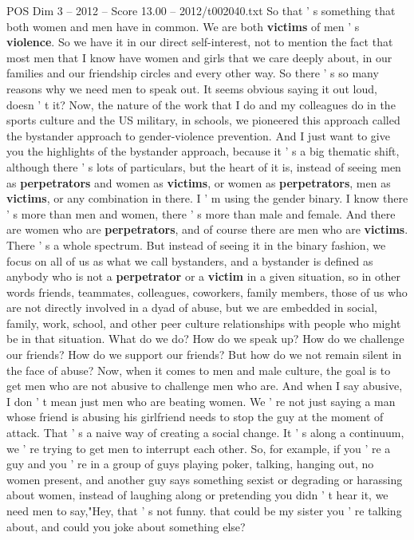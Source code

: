 \begin{textsample}{POS Dim 3 – 2012 – Score 13.00 – 2012/t002040.txt}
So that ' s something that both women and men have in common.
We are both \textbf{victims} of men ' s \textbf{violence}.
So we have it in our direct self-interest, not to mention the fact that most men that I know have women and girls that we care deeply about, in our families and our friendship circles and every other way.
So there ' s so many reasons why we need men to speak out.
It seems obvious saying it out loud, doesn ' t it?
Now, the nature of the work that I do and my colleagues do in the sports culture and the US military, in schools, we pioneered this approach called the bystander approach to gender-violence prevention.
And I just want to give you the highlights of the bystander approach, because it ' s a big thematic shift, although there ' s lots of particulars, but the heart of it is, instead of seeing men as \textbf{perpetrators} and women as \textbf{victims}, or women as \textbf{perpetrators}, men as \textbf{victims}, or any combination in there.
I ' m using the gender binary.
I know there ' s more than men and women, there ' s more than male and female.
And there are women who are \textbf{perpetrators}, and of course there are men who are \textbf{victims}.
There ' s a whole spectrum.
But instead of seeing it in the binary fashion, we focus on all of us as what we call bystanders, and a bystander is defined as anybody who is not a \textbf{perpetrator} or a \textbf{victim} in a given situation, so in other words friends, teammates, colleagues, coworkers, family members, those of us who are not directly involved in a dyad of abuse, but we are embedded in social, family, work, school, and other peer culture relationships with people who might be in that situation.
What do we do?
How do we speak up?
How do we challenge our friends?
How do we support our friends?
But how do we not remain silent in the face of abuse?
Now, when it comes to men and male culture, the goal is to get men who are not abusive to challenge men who are.
And when I say abusive, I don ' t mean just men who are beating women.
We ' re not just saying a man whose friend is abusing his girlfriend needs to stop the guy at the moment of attack.
That ' s a naive way of creating a social change.
It ' s along a continuum, we ' re trying to get men to interrupt each other.
So, for example, if you ' re a guy and you ' re in a group of guys playing poker, talking, hanging out, no women present, and another guy says something sexist or degrading or harassing about women, instead of laughing along or pretending you didn ' t hear it, we need men to say,"Hey, that ' s not funny. that could be my sister you ' re talking about, and could you joke about something else?

\end{textsample}
